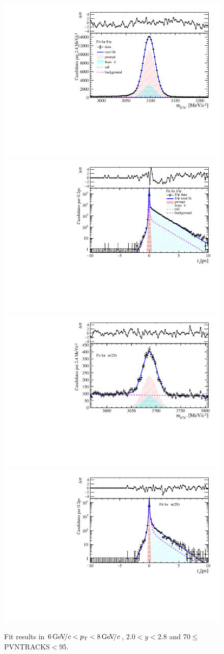 \begin{figure}[H]
\begin{center}
\includegraphics[width=0.47\linewidth]{pdf/Jpsi/drawmass/n4y1pt4.pdf}
\includegraphics[width=0.47\linewidth]{pdf/Jpsi/2DFit/n4y1pt4.pdf}
\vspace*{-0.5cm}
\includegraphics[width=0.47\linewidth]{pdf/Psi2S/drawmass/n4y1pt4.pdf}
\includegraphics[width=0.47\linewidth]{pdf/Psi2S/2DFit/n4y1pt4.pdf}
\vspace*{-0.5cm}
\end{center}
\caption{Fit results in $6\text{\,Ge\kern -0.1em V\!/}c<p_{\mathrm{T}}<8\text{\,Ge\kern -0.1em V\!/}c$, $2.0<y<2.8$ and 70$\leq$PVNTRACKS$<$95.}
\label{Fitn4y1pt4}
\end{figure}
